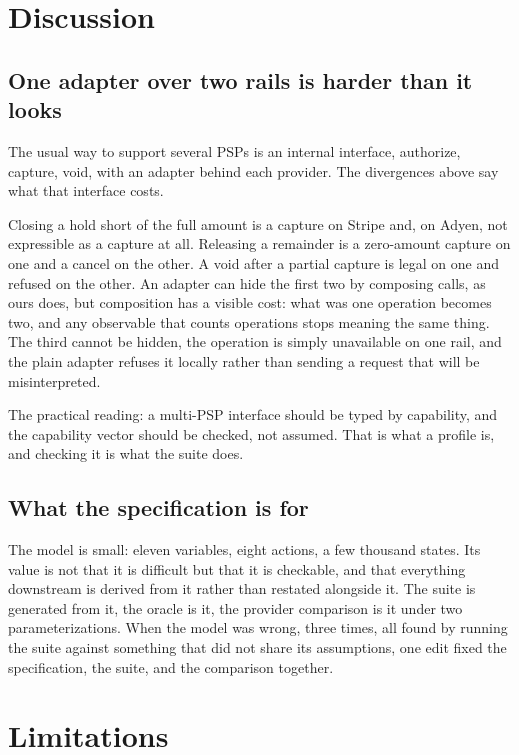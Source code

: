 \documentclass[conference]{IEEEtran}
\begin{document}
\section{Discussion}

\subsection{One adapter over two rails is harder than it looks}

The usual way to support several PSPs is an internal interface, authorize,
capture, void, with an adapter behind each provider. The divergences above say
what that interface costs.

Closing a hold short of the full amount is a capture on Stripe and, on Adyen, not
expressible as a capture at all. Releasing a remainder is a zero-amount capture
on one and a cancel on the other. A void after a partial capture is legal on one
and refused on the other. An adapter can hide the first two by composing calls,
as ours does, but composition has a visible cost: what was one operation becomes
two, and any observable that counts operations stops meaning the same thing.
The third cannot be hidden, the operation is simply unavailable on one rail,
and the plain adapter refuses it locally rather than sending a request that will
be misinterpreted.

The practical reading: a multi-PSP interface should be typed by capability, and
the capability vector should be checked, not assumed. That is what a profile is,
and checking it is what the suite does.

\subsection{What the specification is for}

The model is small: eleven variables, eight actions, a few thousand states. Its
value is not that it is difficult but that it is checkable, and that everything
downstream is derived from it rather than restated alongside it. The suite is
generated from it, the oracle is it, the provider comparison is it under two
parameterizations. When the model was wrong, three times, all found by running
the suite against something that did not share its assumptions, one edit fixed
the specification, the suite, and the comparison together.

\section{Limitations}
\label{sec:limitations}
\end{document}
